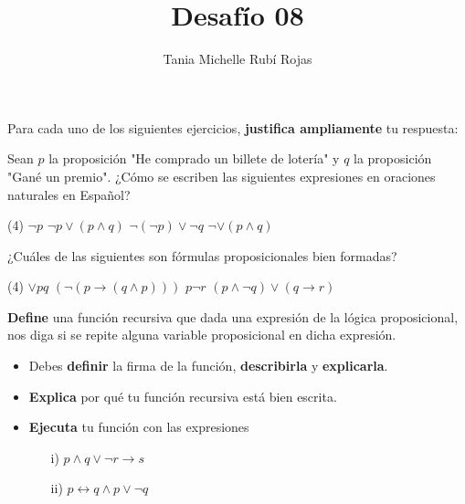 \documentclass[oneside]{style}
\title{Desafío 08}
\author{Tania Michelle Rubí Rojas}
\begin{document}
\maketitle

Para cada uno de los siguientes ejercicios, \textbf{justifica ampliamente} tu 
respuesta:

\begin{questions}[label=\protect\circled{\bfseries\arabic*}]
    \question
    {
        Sean $p$ la proposición "He comprado un billete de lotería" y $q$ la 
        proposición "Gané un premio". ¿Cómo se escriben las siguientes 
        expresiones en oraciones naturales en Español?
        \begin{tasks}(4)
            \task $\neg p$
            \task $\neg p \lor (p \land q)$
            \task $\neg (\neg p) \lor \neg q$
            \task $\neg \lor (p \land q)$
        \end{tasks}
    }

    \question
    {
        ¿Cuáles de las siguientes son fórmulas proposicionales bien formadas?
        \begin{tasks}(4)
            \task $\lor pq$
            \task $(\neg (p \rightarrow (q \land p)))$
            \task $p \neg r$
            \task $(p \land \neg q) \lor (q \rightarrow r)$
        \end{tasks}
    }

    \question
    {
        \textbf{Define} una función recursiva que dada una expresión de la 
        lógica proposicional, nos diga si se repite alguna variable 
        proposicional en dicha expresión.
        \begin{itemize}
            \item Debes \textbf{definir} la firma de la función, 
            \textbf{describirla} y \textbf{explicarla}. 

            \item \textbf{Explica} por qué tu función recursiva está bien 
            escrita. 

            \item \textbf{Ejecuta} tu función con las expresiones 
            \begin{itemize}
                \item[i)] $p \land q \lor \neg r \rightarrow s$
                \item[ii)] $p \leftrightarrow q \land p \lor \neg q$
            \end{itemize}
        \end{itemize}
    }


\end{questions}
\end{document}
